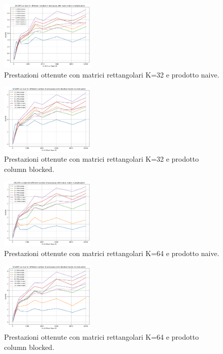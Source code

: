 \documentclass[conference]{IEEEtran}
\begin{document}
\begin{figure}[H]
    \centering
    \includegraphics[width=0.4\textwidth]{resources/rettangolari_k32_naive.png}
    \caption{Prestazioni ottenute con matrici rettangolari K=32 e prodotto naive.}
    \label{fig:rect_k32_matrix_naive}
\end{figure}
\begin{figure}[H]
    \centering
    \includegraphics[width=0.4\textwidth]{resources/rettangolari_k32_blocked.png}
    \caption{Prestazioni ottenute con matrici rettangolari K=32 e prodotto column blocked.}
    \label{fig:rect_k32_matrix_blocked}
\end{figure}
\begin{figure}[H]
    \centering
    \includegraphics[width=0.4\textwidth]{resources/rettangolari_k64_naive.png}
    \caption{Prestazioni ottenute con matrici rettangolari K=64 e prodotto naive.}
    \label{fig:rect_k64_matrix_naive}
\end{figure}
\begin{figure}[H]
    \centering
    \includegraphics[width=0.4\textwidth]{resources/rettangolari_k64_blocked.png}
    \caption{Prestazioni ottenute con matrici rettangolari K=64 e prodotto column blocked.}
    \label{fig:rect_k64_matrix_blocked}
\end{figure}
\end{document}
